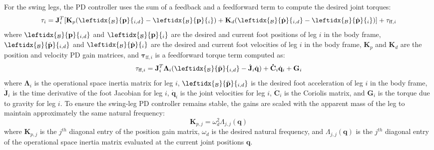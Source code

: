 \documentclass[12pt,a4paper]{article}
\theoremstyle{plain}
\newtheorem{theorem}{Theorem}[section]
\theoremstyle{definition}
\newtheorem{definition}[theorem]{Definition}
\theoremstyle{remark}
\newcommand{\R}{\mathbb{R}}
\begin{document}
For the swing legs, the PD controller uses the sum of a feedback and a feedforward term to compute the desired joint torques:
\[
\mathbf{\tau}_i = \mathbf{J}_i^T[\mathbf{K}_p(\leftidx{_\mathcal{B}}{\mathbf{p}}{_{i,d}} - \leftidx{_\mathcal{B}}{\mathbf{p}}{_{i}}) + \mathbf{K}_d(\leftidx{_\mathcal{B}}{\dot{\mathbf{p}}}{_{i,d}} - \leftidx{_\mathcal{B}}{\dot{\mathbf{p}}}{_{i}})] + \mathbf{\tau}_{\text{ff}, i}
\]
where $\leftidx{_\mathcal{B}}{\mathbf{p}}{_{i,d}}$ and $\leftidx{_\mathcal{B}}{\mathbf{p}}{_{i}}$ are the desired and current foot positions of leg $i$ in the body frame, $\leftidx{_\mathcal{B}}{\dot{\mathbf{p}}}{_{i,d}}$ and $\leftidx{_\mathcal{B}}{\dot{\mathbf{p}}}{_{i}}$ are the desired and current foot velocities of leg $i$ in the body frame, $\mathbf{K}_p$ and $\mathbf{K}_d$ are the position and velocity PD gain matrices, and $\mathbf{\tau}_{\text{ff}, i}$ is a feedforward torque term computed as:
\[  
    \mathbf{\tau}_{\text{ff}, i} = \mathbf{J}_i^T\mathbf{\Lambda}_i(\leftidx{_\mathcal{B}}{\ddot{\mathbf{p}}}{_{i,d}} - \dot{\mathbf{J}}_i\dot{\mathbf{q}}) + \mathbf{\dot{C}}_i\dot{\mathbf{q}}_i + \mathbf{G}_i 
\]
where $\mathbf{\Lambda}_i$ is the operational space inertia matrix for leg $i$, $\leftidx{_\mathcal{B}}{\ddot{\mathbf{p}}}{_{i,d}}$ is the desired foot acceleration of leg $i$ in the body frame, $\dot{\mathbf{J}}_i$ is the time derivative of the foot Jacobian for leg $i$, $\dot{\mathbf{q}}_i$ is the joint velocities for leg $i$, $\mathbf{\dot{C}}_i$ is the Coriolis matrix, and $\mathbf{G}_i$ is the torque due to gravity for leg $i$. To ensure the swing-leg PD controller remains stable, the gains are scaled with the apparent mass of the leg to maintain approximately the same natural frequency:
\[
\mathbf{K}_{p,j} = \omega_d^2\Lambda_{j,j}(\mathbf{q})
\]
where $\mathbf{K}_{p,j}$ is the $j^{th}$ diagonal entry of the position gain matrix, $\omega_d$ is the desired natural frequency, and $\Lambda_{j,j}(\mathbf{q})$ is the $j^{th}$ diagonal entry of the operational space inertia matrix evaluated at the current joint positions $\mathbf{q}$.
    



\end{document}
